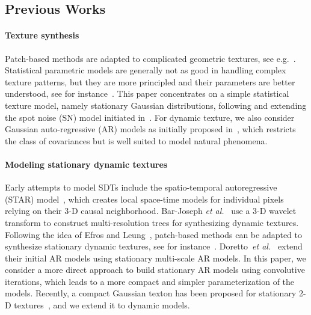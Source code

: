 \subsection{Previous Works}
\label{sec:prev_work}

\paragraph{Texture synthesis}

Patch-based methods are adapted to complicated geometric textures, see e.g.~\cite{efros-nonparam-sampling,StarWei09}. Statistical parametric models are generally not as good in handling complex texture patterns, but they are more principled and their parameters are better understood, see for instance~\cite{portilla-parametric-model}. This paper concentrates on a simple statistical texture model, namely stationary Gaussian distributions, following and extending the spot noise (SN) model initiated in~\cite{galerne-ieee}. For dynamic texture, we also consider Gaussian auto-regressive (AR) models as initially proposed in~\cite{doretto-ijcv}, which restricts the class of covariances but is well suited to model natural phenomena.

\paragraph{Modeling stationary dynamic textures}

Early attempts to model SDTs include the spatio-temporal autoregressive (STAR) model~\cite{Szummer96a}, which creates local space-time models for individual pixels relying on their 3-D causal neighborhood. Bar-Joseph {\it et al.}~\cite{bar-joseph-texture-mixing} use a 3-D wavelet transform to construct multi-resolution trees for synthesizing dynamic textures. Following the idea of Efros and Leung~\cite{efros-nonparam-sampling}, patch-based methods can be adapted to synthesize stationary dynamic textures, see for instance~\cite{WeiLevoy,Kwatra2003}. Doretto~{\it et al.}~\cite{Doretto04spatiallyhomogeneous,doretto-ijcv} extend their initial AR models using stationary multi-scale AR models. In this paper, we consider a more direct approach to build stationary AR models using convolutive iterations, which leads to a more compact and simpler parameterization of the models.
Recently, a compact Gaussian texton has been proposed for stationary 2-D textures~\cite{Desolneux-Moisan-12}, and we extend it to dynamic models.


